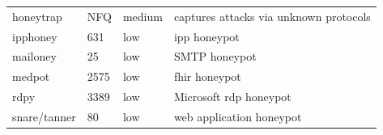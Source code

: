 \begin{table}
{\begin{tabularx}{\linewidth}{l|XlX}
        honeytrap \cite{honeytrap2021}           & NFQ                                                                                                         & medium                     & captures attacks via unknown protocols                                               \\
        ipphoney \cite{ipphoney2021}             & 631                                                                                                         & low                        & \ac{ipp} honeypot                                                                    \\
        mailoney                                 & 25                                                                                                          & low                        & SMTP honeypot                                                                        \\
        medpot \cite{medpot2021}                 & 2575                                                                                                        & low                        & \ac{fhir} honeypot                                                                   \\
        rdpy \cite{rdpy2021}                     & 3389                                                                                                        & low                        & Microsoft \ac{rdp} honeypot                                                          \\
        snare/tanner \cite{snare2021}            & 80                                                                                                          & low                        & web application honeypot                                                             \\

\end{tabularx}}
\end{table}
